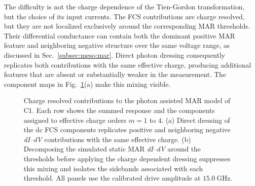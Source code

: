         The difficulty is not the charge dependence of the Tien-Gordon transformation, but the choice of its input currents. The FCS contributions are charge resolved, but they are not localized exclusively around the corresponding MAR thresholds. Their differential conductance can contain both the dominant positive MAR feature and neighboring negative structure over the same voltage range, as discussed in Sec.~\ref{subsec:meso:mar}. Direct photon dressing consequently replicates both contributions with the same effective charge, producing additional features that are absent or substantially weaker in the measurement. The component maps in Fig.~\ref{fig:ac:contact1:pamarm}(a) make this mixing visible.

        \begin{figure}[t]
            \centering
            \caption{
                Charge resolved contributions to the photon assisted MAR model of C1. Each row shows the summed response and the components assigned to effective charge orders $m=1$ to $4$. (a) Direct dressing of the dc FCS components replicates positive and neighboring negative \textit{dI--dV} contributions with the same effective charge. (b) Decomposing the simulated static MAR \textit{dI--dV} around the thresholds before applying the charge dependent dressing suppresses this mixing and isolates the sidebands associated with each threshold. All panels use the calibrated drive amplitude at $\qty{15.0}{\giga\hertz}$.
            }
            \label{fig:ac:contact1:pamarm}
        \end{figure}

